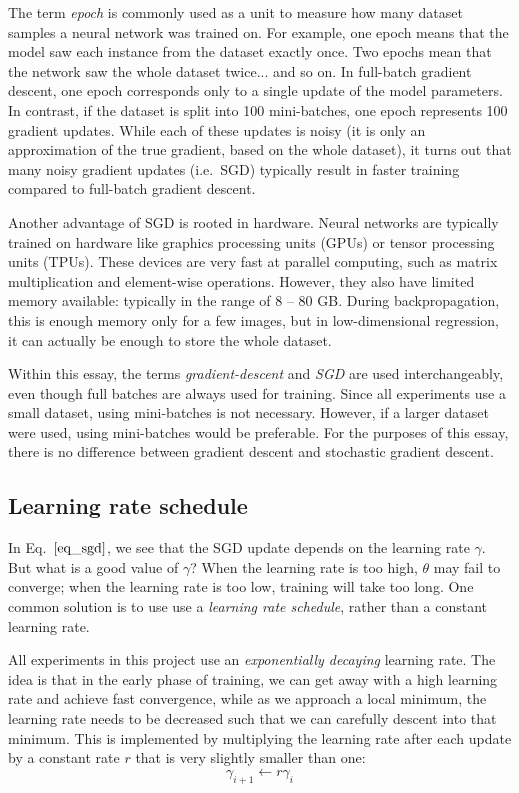 \documentclass[12pt]{article}
\begin{document}
The term \textit{epoch} is commonly used as a unit to measure how many dataset samples a neural network was trained on. For example, one epoch means that the model saw each instance from the dataset exactly once. Two epochs mean that the network saw the whole dataset twice... and so on. In full-batch gradient descent, one epoch corresponds only to a single update of the model parameters. In contrast, if the dataset is split into 100 mini-batches, one epoch represents 100 gradient updates. While each of these updates is noisy (it is only an approximation of the true gradient, based on the whole dataset), it turns out that many noisy gradient updates (i.e.\ SGD) typically result in faster training compared to full-batch gradient descent.

Another advantage of SGD is rooted in hardware. Neural networks are typically trained on hardware like graphics processing units (GPUs) or tensor processing units (TPUs). These devices are very fast at parallel computing, such as matrix multiplication and element-wise operations. However, they also have limited memory available: typically in the range of 8 -- 80 GB. During backpropagation, this is enough memory only for a few images, but in low-dimensional regression, it can actually be enough to store the whole dataset.

Within this essay, the terms \textit{gradient-descent} and \textit{SGD} are used interchangeably, even though full batches are always used for training. Since all experiments use a small dataset, using mini-batches is not necessary. However, if a larger dataset were used, using mini-batches would be preferable. For the purposes of this essay, there is no difference between gradient descent and stochastic gradient descent.

\subsection{Learning rate schedule}

In Eq.\ $\ref{eq_sgd}$, we see that the SGD update depends on the learning rate $\gamma$. But what is a good value of $\gamma$? When the learning rate is too high, $\theta$ may fail to converge; when the learning rate is too low, training will take too long. One common solution is to use use a \textit{learning rate schedule}, rather than a constant learning rate.

All experiments in this project use an \textit{exponentially decaying} learning rate. The idea is that in the early phase of training, we can get away with a high learning rate and achieve fast convergence, while as we approach a local minimum, the learning rate needs to be decreased such that we can carefully descent into that minimum. This is implemented by multiplying the learning rate after each update by a constant rate $r$ that is very slightly smaller than one:
\begin{equation}
\gamma_{i+1} \leftarrow r \gamma_i
\end{equation}
\end{document}
